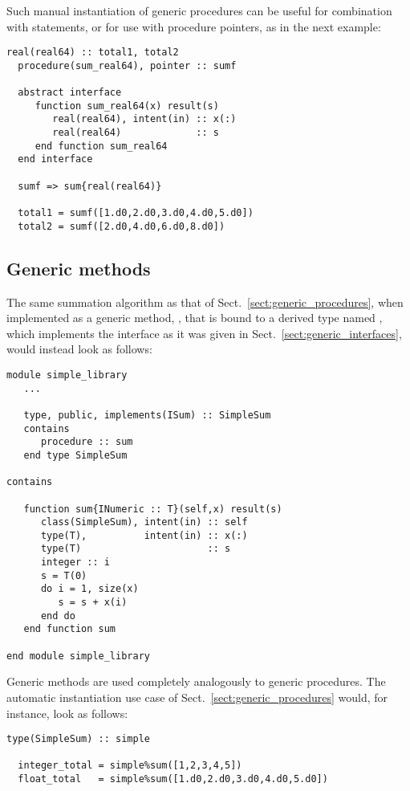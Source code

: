 \documentclass[11pt,oneside]{report}
\newcommand{\code}[1]{{\selectfont\ttfamily{#1}}}
\begin{document}
Such manual instantiation of generic procedures can be useful for
combination with \code{associate} statements, or for use with
procedure pointers, as in the next example:
\begin{lstlisting}[language=LFortran,style=boxed]
  real(real64) :: total1, total2
  procedure(sum_real64), pointer :: sumf

  abstract interface
     function sum_real64(x) result(s)
        real(real64), intent(in) :: x(:)
        real(real64)             :: s
     end function sum_real64  
  end interface
  
  sumf => sum{real(real64)}

  total1 = sumf([1.d0,2.d0,3.d0,4.d0,5.d0])
  total2 = sumf([2.d0,4.d0,6.d0,8.d0])
\end{lstlisting}

\subsection{Generic methods}
\label{sect:generic_methods}

The same summation algorithm as that of
Sect.~\ref{sect:generic_procedures}, when implemented as a generic
method, \code{sum}, that is bound to a derived type named
\code{SimpleSum}, which implements the interface \code{ISum} as it was
given in Sect.~\ref{sect:generic_interfaces}, would instead look as
follows:
\begin{lstlisting}[language=LFortran,style=boxed]
module simple_library
   ...

   type, public, implements(ISum) :: SimpleSum
   contains
      procedure :: sum
   end type SimpleSum

contains
   
   function sum{INumeric :: T}(self,x) result(s)
      class(SimpleSum), intent(in) :: self
      type(T),          intent(in) :: x(:)
      type(T)                      :: s
      integer :: i
      s = T(0)
      do i = 1, size(x)
         s = s + x(i)
      end do
   end function sum

end module simple_library
\end{lstlisting}

Generic methods are used completely analogously to generic
procedures. The automatic instantiation use case of
Sect.~\ref{sect:generic_procedures} would, for instance, look as
follows:
\begin{lstlisting}[language=LFortran,style=boxed]
  type(SimpleSum) :: simple

  integer_total = simple%sum([1,2,3,4,5])
  float_total   = simple%sum([1.d0,2.d0,3.d0,4.d0,5.d0])
\end{lstlisting}
\end{document}
